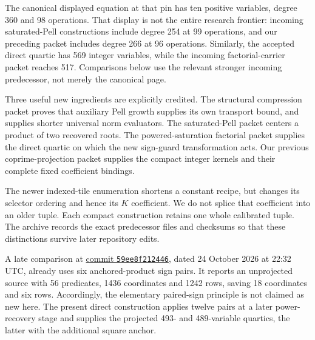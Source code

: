 The canonical displayed equation at that pin has ten positive variables,
degree 360 and 98 operations. That display is not the entire research
frontier: incoming saturated-Pell constructions include degree 254 at
99 operations, and our preceding packet includes degree 266 at 96
operations. Similarly, the accepted direct quartic has 569 integer
variables, while the incoming factorial-carrier packet reaches 517.
Comparisons below use the relevant stronger incoming predecessor, not
merely the canonical page.

Three useful new ingredients are explicitly credited. The structural
compression packet proves that auxiliary Pell growth supplies its own
transport bound, and supplies shorter universal norm evaluators. The
saturated-Pell packet centers a product of two recovered roots. The
powered-saturation factorial packet supplies the direct quartic on which
the new sign-guard transformation acts. Our previous coprime-projection
packet supplies the compact integer kernels and their complete fixed
coefficient bindings.

The newer indexed-tile enumeration shortens a constant recipe, but changes
its selector ordering and hence its $K$ coefficient. We do not splice that
coefficient into an older tuple. Each compact construction retains one
whole calibrated tuple. The archive records the exact predecessor files
and checksums so that these distinctions survive later repository edits.

A late comparison at
\href{https://github.com/VladimirReshetnikov/ProveIt/tree/59ee8f21244635b42f706a74c4e9631226dd1f7c}{commit
\texttt{59ee8f212446}}, dated 24 October 2026 at 22:32 UTC, already uses
six anchored-product sign pairs. It reports an unprojected source with
56 predicates, 1436 coordinates and 1242 rows, saving 18 coordinates and
six rows. Accordingly, the elementary paired-sign principle is not claimed
as new here. The present direct construction applies twelve pairs at a
later power-recovery stage and supplies the projected 493- and 489-variable
quartics, the latter with the additional square anchor.

